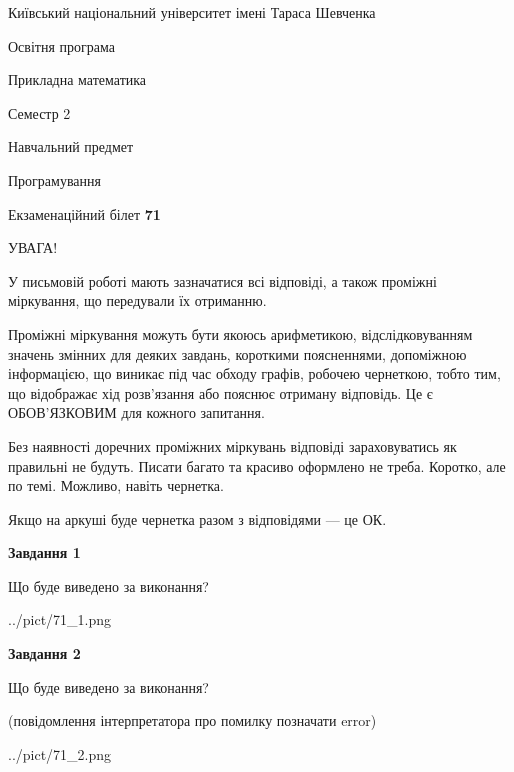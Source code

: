 \documentclass[12pt, ukrainian]{article}
\begin{document}
{{\begin {small}\par
{ \center  Київський національний університет імені Тараса Шевченка \par}
{\parbox {5 cm}{Освітня програма \hfill}{\parbox {7 cm}{Прикладна математика\hfill}}\parbox {6 cm}{\hfill Семестр 2}}\par
{\parbox {5 cm} {Навчальний предмет \hfill}\parbox {7 cm}{Програмування \hfill}\parbox {6cm}{\hfill}\par}\vspace{-7pt} \end{small}}{\center Екзаменаційний білет \No \textbf
{ 71 }\par}}
{
\begin {large}
УВАГА!

У письмовій роботі мають зазначатися всі відповіді, а також проміжні міркування, що передували їх отриманню.

Проміжні міркування можуть бути якоюсь арифметикою, відслідковуванням зна\-чень змінних для деяких завдань,
короткими поясненнями, допоміжною інформацією, що виникає під час обходу графів, робочею чернеткою,
тобто тим, що відображає хід розв’язання або пояснює отриману відповідь.
Це є ОБОВ’ЯЗКОВИМ для кожного запитання.

Без наявності доречних проміжних міркувань відповіді зараховуватись як правиль\-ні не будуть.
Писати багато та красиво оформлено не треба. Коротко, але по темі. Можли\-во, навіть чернетка.

Якщо на аркуші буде чернетка разом з відповідями --- це ОК.

\newpage

{\begin {center}\textbf{Завдання 1}\end {center}}\par
Що буде виведено за виконання?\par
\begin{center}
	{../pict/71_1.png}
\end{center}
\newpage

{\begin {center}\textbf{Завдання 2}\end {center}}\par
Що буде виведено за виконання?\par
 (повідомлення інтерпретатора про помилку позначати error)\par
\begin{center}
	{../pict/71_2.png}
\end{center}
\newpage


\end{large}}
\end{document}
